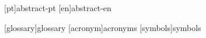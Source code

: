 %



%
%
%
%
[pt]{abstract-pt}  %
[en]{abstract-en}  %



%
%
%
[glossary]{glossary}
[acronym]{acronyms}
[symbols]{symbols}



